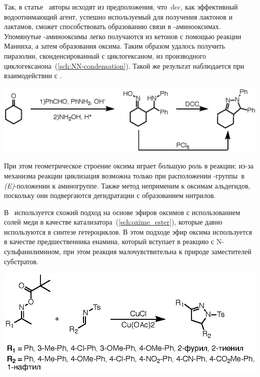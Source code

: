 Так, в статье~\cite{Hassner1962a} авторы исходят из предположения, что~\ac{dcc}, как эффективный водоотнимающий агент, успешно используемый для получения лактонов и лактамов, сможет способствовать образованию связи  в \chembeta-аминооксимах.
Упомянутые \chembeta-аминооксимы легко получаются из кетонов с помощью реакции Манниха, а затем образования оксима.
Таким образом удалось получить пиразолин, сконденсированный с циклогексаном, из производного циклогексанона~(\ref{sch:NN-condensation}).
Такой же результат наблюдается при взаимодействии с .

\begin{scheme}[h!]
    \centering
    \includegraphics{sections/literature/img/NN-condensation.eps}
    \caption{}
    \label{sch:NN-condensation}
\end{scheme}

При этом геометрическое строение оксима играет большую роль в реакции; из-за механизма реакции циклизация возможна только при расположении \mbox{-группы }в \mbox{\emph{(E)}-положении} к аминогруппе.
Также метод неприменим к оксимам альдегидов, поскольку они подвергаются дегидратации с образованием нитрилов.

В~\cite{Wu2014d} используется схожий подход на основе эфиров оксимов с использованием солей меди в качестве катализатора~(\ref{sch:oxime_ester}), которые давно используются в синтезе гетероциклов.
В этом подходе эфир оксима используется в качестве предшественника енамина, который вступает в реакцию с N-сульфанилимином, при этом реакция малочувствительна к природе заместителей субстратов.

\begin{scheme}[h!]
    \centering
    \includegraphics{sections/literature/img/oxime_ester.eps}
    \caption{}
    \label{sch:oxime_ester}
\end{scheme}

